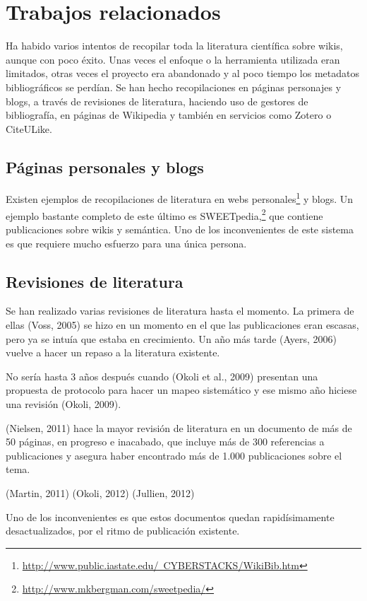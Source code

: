 \documentclass[11pt,twocolumn]{article}
\begin{document}
\section{Trabajos relacionados}
Ha habido varios intentos de recopilar toda la literatura científica sobre wikis, aunque con poco éxito. Unas veces el enfoque o la herramienta utilizada eran limitados, otras veces el proyecto era abandonado y al poco tiempo los metadatos bibliográficos se perdían. Se han hecho recopilaciones en páginas personajes y blogs, a través de revisiones de literatura, haciendo uso de gestores de bibliografía, en páginas de Wikipedia y también en servicios como Zotero o CiteULike.

\subsection{Páginas personales y blogs}
Existen ejemplos de recopilaciones de literatura en webs personales\footnote{\href{http://www.public.iastate.edu/~CYBERSTACKS/WikiBib.htm}{http://www.public.iastate.edu/~CYBERSTACKS/WikiBib.htm}} y blogs. Un ejemplo bastante completo de este último es SWEETpedia,\footnote{\href{http://www.mkbergman.com/sweetpedia/}{http://www.mkbergman.com/sweetpedia/}} que contiene publicaciones sobre wikis y semántica. Uno de los inconvenientes de este sistema es que requiere mucho esfuerzo para una única persona.

\subsection{Revisiones de literatura}
Se han realizado varias revisiones de literatura hasta el momento. La primera de ellas (Voss, 2005) se hizo en un momento en el que las publicaciones eran escasas, pero ya se intuía que estaba en crecimiento. Un año más tarde (Ayers, 2006) vuelve a hacer un repaso a la literatura existente.

No sería hasta 3 años después cuando (Okoli et al., 2009) presentan una propuesta de protocolo para hacer un mapeo sistemático y ese mismo año hiciese una revisión (Okoli, 2009).

(Nielsen, 2011) hace la mayor revisión de literatura en un documento de más de 50 páginas, en progreso e inacabado, que incluye más de 300 referencias a publicaciones y asegura haber encontrado más de 1.000 publicaciones sobre el tema.

(Martin, 2011)
(Okoli, 2012)
(Jullien, 2012)

Uno de los inconvenientes es que estos documentos quedan rapidísimamente desactualizados, por el ritmo de publicación existente.
\end{document}
